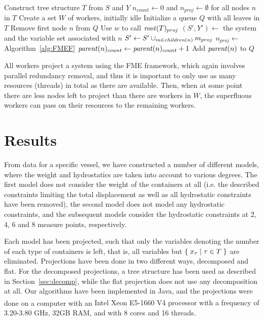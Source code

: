 \begin{algorithmic}
	\State Construct  tree structure $T$ from $S$ and $Y$
	\State $n_{count}\gets 0$ and $n_{proj}\gets\emptyset$ for all nodes $n$ in $T$
	\State Create a set $W$ of workers, initially idle
	\State Initialize a queue $Q$ with all leaves in $T$
			\State Remove first node $n$ from $Q$
			\State Use $w$ to call 
		\EndIf
	\EndWhile
	\State \Return $\mathit{root}(T)_{proj}$
\EndFunction
\Statex
{}
	\State $(S',Y')\gets$ the system and the variable set associated with $n$
	\State $S'\gets S'\cup_{m\in \mathit{children}(n)} m_{proj}$ 
	\State $n_{proj}\gets$  \Comment Algorithm~\ref{alg:FMEF}
	\State $\mathit{parent}(n)_{count} \gets \mathit{parent}(n)_{count} +1$
		\State Add $\mathit{parent}(n)$ to $Q$
	\EndIf
	\State \Return
\EndFunction
\end{algorithmic}	

\vspace{1mm}
All workers project a system using the FME framework, which again involves parallel redundancy removal, and thus it is important to only use as many resources (threads) in total as there are available.
Then, when at some point there are less nodes left to project than there are workers in $W$, the superfluous workers can pass on their resources to the remaining workers.  

\section{Results}\label{sec:results}
From data for a specific vessel, we have constructed a number of different models, where the weight and hydrostatics are taken into account to various degrees. The first model does not consider the weight of the containers at all (i.e. the described constraints limiting the total displacement as well as all hydrostatic constraints have been removed), the second model does not model any hydrostatic constraints, and the subsequent models consider the hydrostatic constraints at 2, 4, 6 and 8 measure points, respectively.

Each model has been projected, such that only the variables denoting the number of each type of containers is left, that is, all variables but $\{\;{x_\tau}\;|\;{\tau\in T}\;\}$ are eliminated. 
Projections have been done in two different ways, decomposed and flat. For the decomposed projections, a tree structure has been used as described in Section~\ref{sec:decomp}, while the flat projection does not use any decomposition at all. 
Our algorithms have been implemented in Java, and the projections were done on a computer with an {Intel\textsuperscript{\textregistered} Xeon\textsuperscript{\textregistered} E5-1660 V4 processor with a frequency of 3.20-3.80 GHz, 32GB RAM, and with 8 cores and 16 threads.}

